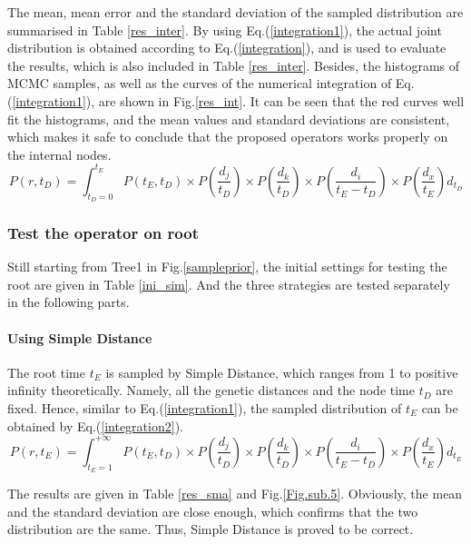 \documentclass{bmcart}
\begin{document}
The mean, mean error and the standard deviation of the sampled distribution are summarised in Table \ref{res_inter}. By using Eq.(\ref{integration1}), the actual joint distribution is obtained according to Eq.(\ref{integration}), and is used to evaluate the results, which is also included in Table \ref{res_inter}. Besides, the histograms of MCMC samples, as well as the curves of the numerical integration of Eq.(\ref{integration1}), are shown in Fig.\ref{res_int}. It can be seen that the red curves well fit the histograms, and the mean values and standard deviations are consistent, which makes it safe to conclude that the proposed operators works properly on the internal nodes.
\begin{equation}
\label{integration1}
P(r,{t_D}) = \int_{{t_D} = 0}^{{t_E}} {P({t_E},{t_D}) \times P(\frac{{{d_j}}}{{{t_D}}}) \times P(\frac{{{d_k}}}{{{t_D}}}) \times P(\frac{{{d_i}}}{{{t_E} - {t_D}}}) \times P(\frac{{{d_x}}}{{{t_E}}}){d_{t_D}}}
\end{equation}
\subsubsection*{Test the operator on root}
Still starting from Tree1 in Fig.\ref{sampleprior}, the initial settings for testing the root are given in Table \ref{ini_sim}. And the three strategies are tested separately in the following parts.

\paragraph*{Using Simple Distance}

The root time $t_E$ is sampled by Simple Distance, which ranges from 1 to positive infinity theoretically. Namely, all the genetic distances and the node time $t_D$  are fixed. Hence, similar to Eq.(\ref{integration1}), the sampled distribution of $t_E$ can be obtained by Eq.(\ref{integration2}).
\begin{equation}
\label{integration2}
P(r,{t_E}) = \int_{{t_E} = 1}^{ + \infty } {P({t_E},{t_D}) \times P(\frac{{{d_j}}}{{{t_D}}}) \times P(\frac{{{d_k}}}{{{t_D}}}) \times P(\frac{{{d_i}}}{{{t_E} - {t_D}}}) \times P(\frac{{{d_x}}}{{{t_E}}}){d_{t_E}}}
\end{equation}

The results are given in Table \ref{res_sma} and Fig.\ref{Fig.sub.5}. Obviously, the mean and the standard deviation are close enough, which confirms that the two distribution are the same. Thus, Simple Distance is proved to be correct.
\end{document}

